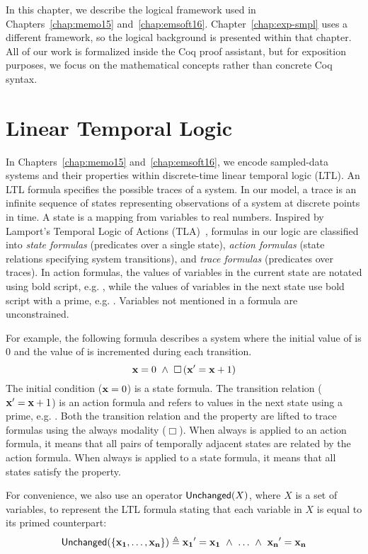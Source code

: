 In this chapter, we describe the logical framework used in
Chapters~\ref{chap:memo15}
and~\ref{chap:emsoft16}. Chapter~\ref{chap:exp-smpl} uses a different
framework, so the logical background is presented within that chapter. All
of our work is formalized inside the Coq proof assistant, but for
exposition purposes, we focus on the mathematical concepts rather than
concrete Coq syntax.

\section{Linear Temporal Logic}
In Chapters~\ref{chap:memo15} and~\ref{chap:emsoft16}, we encode
sampled-data systems and their properties within discrete-time linear
temporal logic (LTL).  An LTL formula specifies the possible traces of a
system.  In our model, a trace is an infinite sequence of states
representing observations of a system at discrete points in time.  A state
is a mapping from variables to real numbers.  Inspired by Lamport's
Temporal Logic of Actions (TLA)~\cite{lamport1994temporal}, formulas in our
logic are classified into \emph{state formulas} (predicates over a single
state), \emph{action formulas} (state relations specifying system
transitions), and \emph{trace formulas} (predicates over traces).  In
action formulas, the values of variables in the current state are notated
using bold script, e.g. , while the values of variables in the
next state use bold script with a prime, e.g. .  Variables
not mentioned in a formula are unconstrained.

For example, the following formula describes a system where the initial
value of  is 0 and the value of  is incremented during
each transition.
\[
\mathbf{x} = 0~\wedge~\Box{} \left(\mathbf{x}^\prime = \mathbf{x} + 1\right)
\]
The initial condition ($\mathbf{x} = 0$) is a state formula.  The
transition relation ($\mathbf{x}^\prime = \mathbf{x} + 1$) is an action
formula and refers to values in the next state using a prime,
e.g. .  Both the transition relation and the property are
lifted to trace formulas using the always modality ($\Box$).  When always
is applied to an action formula, it means that all pairs of temporally
adjacent states are related by the action formula.  When always is applied
to a state formula, it means that all states satisfy the property.

For convenience, we also use an operator $\mathsf{Unchanged}(X)$, where $X$ is a
set of variables, to represent the LTL formula stating that each variable
in $X$ is equal to its primed counterpart:
\[
\mathsf{Unchanged}(\{\mathbf{x_1},\ldots,\mathbf{x_n}\}) \triangleq
\mathbf{x_1}^\prime = \mathbf{x_1}~\wedge~\ldots~\wedge~\mathbf{x_n}^\prime = \mathbf{x_n}
\]

